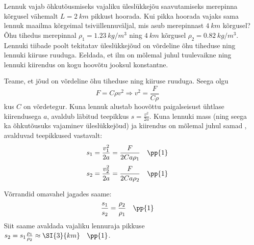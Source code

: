 \setAuthor{}

Lennuk vajab õhkutõusmiseks vajaliku üleslükkejõu saavutamiseks merepinna kõrgusel vähemalt $L=\SI{2}{km}$ pikkust hoorada. Kui pikka hoorada vajaks sama lennuk maailma kõrgeimal tsiviillennuväljal, mis asub merepinnast $\SI{4}{km}$ kõrgusel? Õhu tihedus merepinnal $\rho_1 = \SI{1,23}{kg/m^3}$ ning $\SI{4}{km}$ kõrgusel $\rho_2 = \SI{0,82 }{kg/m^3}$. Lennuki tiibade poolt tekitatav üleslükkejõud on võrdeline õhu tiheduse ning lennuki kiiruse ruuduga. Eeldada, et ilm on mõlemal juhul tuulevaikne ning lennuki kiirendus on kogu hoovõtu jooksul konstantne. 

\hint

\solu
Teame, et jõud on võrdeline õhu tiheduse ning kiiruse ruuduga. Seega olgu 
$$F=C\rho v^2 \Rightarrow v^2=\frac{F}{C\rho}$$
kus $C$ on võrdetegur.  Kuna lennuk alustab hoovõttu paigalseisust ühtlase kiirendusega $a$, avaldub läbitud teepikkus $s=\frac{v^2}{2a}$.  Kuna lennuki mass (ning seega ka õhkutõusuks vajaminev üleslükkejõud) ja kiirendus on mõlemal juhul samad , avalduvad teepikkused vastavalt:
$$s_1=\frac{v_1^2}{2a}=\frac{F}{2Ca\rho_1}\quad\pp{1}$$ 
$$s_2=\frac{v_2^2}{2a}=\frac{F}{2Ca\rho_2}\quad\pp{1}$$   

Võrrandid omavahel jagades saame:
$$\frac{s_1}{s_2}=\frac{\rho_2}{\rho_1}\quad\pp{1}$$ 
Siit saame avaldada vajaliku lennuraja pikkuse $s_2 = s_1\frac{\rho_1}{\rho_2} \approx \SI{3}{km}\quad  \pp{1}$.
\probend